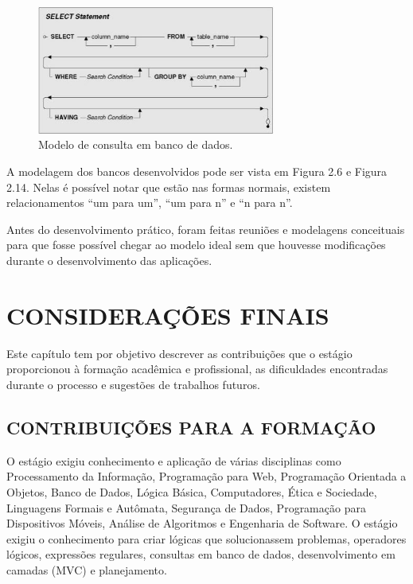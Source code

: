 \documentclass[
  12pt,				%
  openany,
  oneside,
  a4paper,			%
  english,			%
  brazil
]{article}
\numberwithin{figure}{section}
\numberwithin{table}{section}
\begin{document}
\begin{figure}[!htb]
\centering
\includegraphics[width=0.7\textwidth]{figura38}
\caption{Modelo de consulta em banco de dados.}
\end{figure}
A modelagem dos bancos desenvolvidos pode ser vista em Figura 2.6 e Figura 2.14.
Nelas é possível notar que estão nas formas normais, existem relacionamentos “um para um”,
“um para n” e “n para n”.

Antes do desenvolvimento prático, foram feitas reuniões e modelagens conceituais para que fosse possível chegar ao modelo ideal sem que houvesse modificações durante o desenvolvimento das aplicações.


\section{CONSIDERAÇÕES FINAIS}


Este capítulo tem por objetivo descrever as contribuições que o estágio proporcionou à formação acadêmica e profissional, as dificuldades encontradas durante o processo e sugestões de trabalhos futuros.


\subsection{CONTRIBUIÇÕES PARA A FORMAÇÃO}

O estágio exigiu conhecimento e aplicação de várias disciplinas como Processamento da Informação, Programação para Web, Programação Orientada a Objetos, Banco de Dados, Lógica Básica, Computadores, Ética e Sociedade, Linguagens Formais e Autômata, Segurança de Dados, Programação para Dispositivos Móveis, Análise de Algoritmos e Engenharia de Software. O estágio exigiu o conhecimento para criar lógicas que solucionassem problemas,
operadores lógicos, expressões regulares, consultas em banco de dados, desenvolvimento em camadas (MVC) e planejamento.
\end{document}

